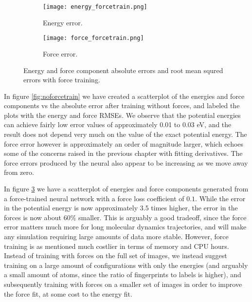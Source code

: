 \begin{figure}[H]
\begin{adjustbox}{max width=1.2\linewidth,center}
\centering
  \begin{subfigure}[b]{0.55\textwidth}
      \texttt{[image: energy\_forcetrain.png]}
      \caption{Energy error.}
    \label{fig:f1}
  \end{subfigure}
  \hfill
  \begin{subfigure}[b]{0.55\textwidth}
      \texttt{[image: force\_forcetrain.png]}
      \caption{Force error.}
    \label{fig:f2}
  \end{subfigure}
\end{adjustbox}
\caption{Energy and force component absolute errors and root mean squred
    errors with force training.}
    \label{fig:forcetrain}
\end{figure}

In figure \ref{fig:noforcetrain} we have created a scatterplot
of the energies and force components vs the absolute error after training without
forces, and labeled the plots with the energy and force RMSEs.
We observe that the potential energies can achieve fairly
low error values of approximately 0.01 to 0.03 eV, and the
result does not depend very much on the value of the exact potential
energy.
The force error however is approximately an order of magnitude
larger, which echoes some of the concerns raised in the previous
chapter with fitting derivatives. The force errors produced by the neural
also appear to be increasing as we move away from zero.
\par
In figure \ref{fig:forcetrain} we have a scatterplot of energies
and force components generated from a force-trained neural network
with a force loss coefficient of $0.1$.
While the error in the potential energy is now approximately 3.5 times higher,
the error in the forces is now about $60 \%$ smaller.
This is arguably a good tradeoff, since the force error matters
much more for long molecular dynamics trajectories, and will make
any simulation requiring large amounts of data more stable.
However, force training is as mentioned much costlier in terms
of memory and CPU hours. Instead of training with forces on the full
set of images, we instead suggest training on a large amount of configurations
with only the energies (and arguably a small amount of atoms, since
the ratio of fingerprints to labels is higher), and subsequently training
with forces on a smaller set of images in order to improve the force fit,
at some cost to the energy fit.

